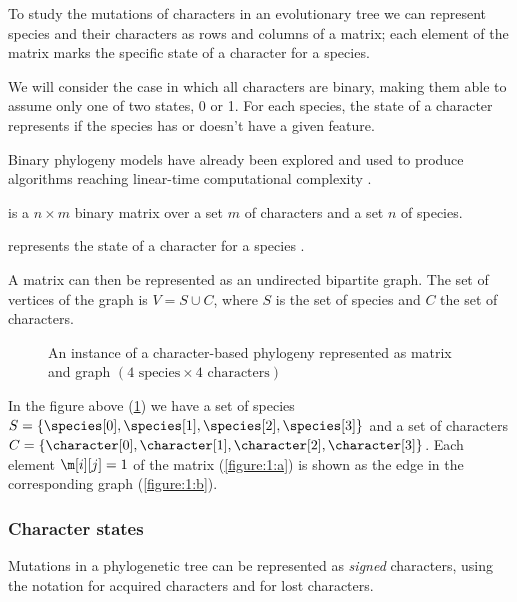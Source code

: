 To study the mutations of characters in an evolutionary tree we can represent species and their characters as rows and columns of a matrix; each element of the matrix marks the specific state of a character for a species.

We will consider the case in which all characters are binary, making them able to assume only one of two states, 0 or 1.
For each species, the state of a character represents if the species has or doesn't have a given feature.

Binary phylogeny models have already been explored \cite{PPPbin2012, NPP2007, IDPP2004} and used to produce algorithms reaching linear-time computational complexity \cite{PPHltime2007, PPHltime2005}.

\begin{definition}\label{definition:m}
  \m{} is a $n \times m$ binary matrix over a set $m$ of characters and a set $n$ of species.

  \m[i][j] represents the state of a character \character[j] for a species \species[i].
\end{definition}

A matrix \m{} can then be represented as an undirected bipartite graph.
The set of vertices of the graph is $V = S \cup C$, where $S$ is the set of species and $C$ the set of characters.

\begin{figure}[ht]
  

  \caption{An instance of a character-based phylogeny represented as matrix and graph $(\text{4 species} \times \text{4 characters})$}\label{figure:1}
\end{figure}

In the figure above (\ref{figure:1}) we have a set of species $S = \{ \species[0], \species[1], \species[2], \species[3] \}$ and a set of characters $C = \{ \character[0], \character[1], \character[2], \character[3] \}$.
Each element $\m[i][j] = 1$ of the matrix (\ref{figure:1:a}) is shown as the edge \edge{\species[i]}{\character[j]} in the corresponding graph (\ref{figure:1:b}).

\subsubsection{Character states}\label{section:character-states}

Mutations in a phylogenetic tree can be represented as \emph{signed} characters, using the notation \character[][+] for acquired characters and \character[][-] for lost characters.

